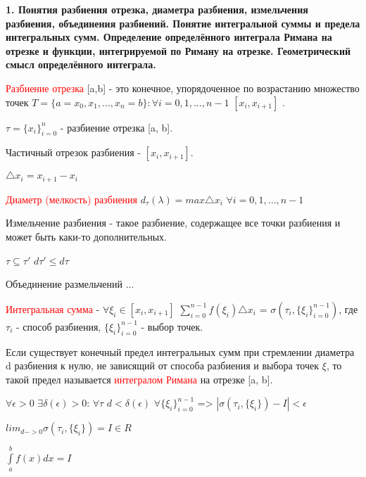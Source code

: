 \documentclass{article}
\begin{document}
\begin{center}
\textbf{1. Понятия разбиения отрезка, диаметра разбиения, измельчения разбиения, объединения разбиений.
Понятие интегральной суммы и предела интегральных сумм. Определение определённого интеграла Римана на отрезке и функции, интегрируемой по Риману на отрезке. Геометрический смысл
определённого интеграла.}
\end{center}

\textcolor{red}{Разбиение отрезка }
[a,b] - это конечное, упорядоченное по возрастанию множество точек $T = \{a = x_0, x_1, ... , x_n=b\} : \forall i = 0, 1,..., n-1 $   $[x_i, x_{i+1}]$ .
 
 $\tau  = \{x_i\}_{i=0}^n$ - разбиение отрезка [a, b].
 
Частичный отрезок разбиения - $[x_i, x_{i+1}]$.

$\triangle x_i = x_{i+1} - x_i$ 

\textcolor{red}{Диаметр (мелкость) разбиения} $d_\tau(\lambda)  = max \triangle x_i$
$\forall i = 0, 1,..., n-1$

Измельчение разбиения  - такое разбиение, содержащее все точки разбиения и может быть каки-то дополнительных. 

$\tau \subseteq \tau' $ $d\tau' \leq d\tau $

Объединение размельчений ...

\textcolor{red}{Интегральная сумма} - $\forall \xi_i  \in  [x_i, x_{i+1}] $ $\sum_{i=0}^{n-1}f(\xi_i)\triangle x_i$ = $\sigma(\tau_i, \{\xi_i\}_{i=0}^{n-1})$, где $\tau_i$ - способ разбиения, $\{\xi_i\}_{i=0}^{n-1}$ - выбор точек.

Если существует конечный предел интегральных сумм при стремлении диаметра d разбиения к нулю, не зависящий от способа разбиения и выбора точек $\xi$, то такой предел называется \textcolor{red}{интегралом Римана} на отрезке [a, b].

$\forall \epsilon>0$  $\exists\delta(\epsilon) > 0$: $\forall\tau$ $d < \delta(\epsilon)$ $\forall\{\xi_i\}_{i=0}^{n-1}$ => $|\sigma(\tau_i, \{\xi_i\})-I| < \epsilon$ 

$lim_{d->0}\sigma(\tau_i, \{\xi_i\}) = I \in R$

$\int \limits_{a}^{b}f(x)dx = I$
\end{document}
